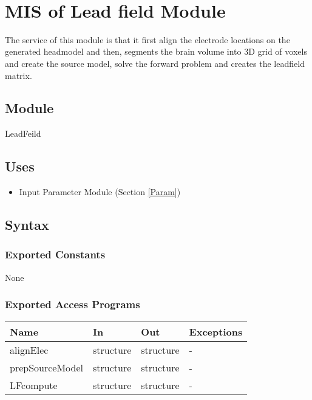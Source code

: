 \documentclass[12pt, titlepage]{article}
\begin{document}
~\newpage

\section{MIS of Lead field Module} \label{LF} 

The service of this module is that it first align the electrode locations on the generated headmodel and then, segments the brain volume into 3D grid of voxels and create the source model, solve the forward problem and creates the leadfield matrix.

\subsection{Module}

LeadFeild

\subsection{Uses}
\begin{itemize}
\item Input Parameter Module (Section \ref{Param})
\end{itemize}

\subsection{Syntax}

\subsubsection{Exported Constants}
None
\subsubsection{Exported Access Programs}

\begin{center}
\begin{tabular}{p{4cm} p{3cm} p{3cm} p{2cm}}
\hline
\textbf{Name} & \textbf{In} & \textbf{Out} & \textbf{Exceptions} \\
\hline
alignElec & structure & structure & - \\
prepSourceModel & structure & structure & - \\
LFcompute & structure & structure & - \\
\hline
\end{tabular}
\end{center}
\end{document}

